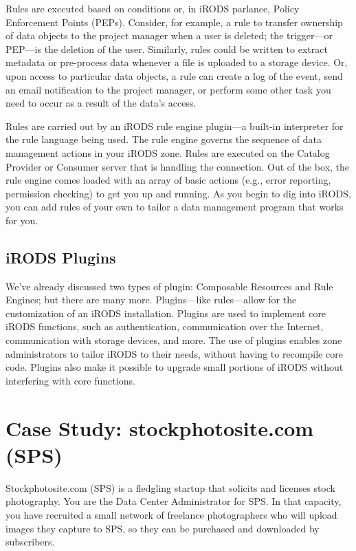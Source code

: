 \documentclass[10pt,oneside]{memoir}
\begin{document}
Rules are executed based on conditions or, in iRODS parlance, Policy Enforcement Points (PEPs). Consider, for example, a rule to transfer ownership of data objects to the project manager when a user is deleted; the trigger---or PEP---is the deletion of the user. Similarly, rules could be written to extract metadata or pre-process data whenever a file is uploaded to a storage device. Or, upon access to particular data objects, a rule can create a log of the event, send an email notification to the project manager, or perform some other task you need to occur as a result of the data's access.

Rules are carried out by an iRODS rule engine plugin---a built-in interpreter for the rule language being used. The rule engine governs the sequence of data management actions in your iRODS zone. Rules are executed on the Catalog Provider or Consumer server that is handling the connection. Out of the box, the rule engine comes loaded with an array of basic actions (e.g., error reporting, permission checking) to get you up and running. As you begin to dig into iRODS, you can add rules of your own to tailor a data management program that works for you.

\section{iRODS Plugins}

We've already discussed two types of plugin: Composable Resources and Rule Engines; but there are many more. Plugins---like rules---allow for the customization of an iRODS installation. Plugins are used to implement core iRODS functions, such as authentication, communication over the Internet, communication with storage devices, and more. The use of plugins enables zone administrators to tailor iRODS to their needs, without having to recompile core code. Plugins also make it possible to upgrade small portions of iRODS without interfering with core functions.

\chapter{Case Study: stockphotosite.com (SPS)}

Stockphotosite.com (SPS) is a fledgling startup that solicits and licenses stock photography. You are the Data Center Administrator for SPS. In that capacity, you have recruited a small network of freelance photographers who will upload images they capture to SPS, so they can be purchased and downloaded by subscribers.
\end{document}
